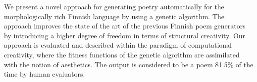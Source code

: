 We present a novel approach for generating poetry automatically for the morphologically rich Finnish language by using a genetic algorithm. The approach improves the state of the art of the previous Finnish poem generators by introducing a higher degree of freedom in terms of structural creativity. Our approach is evaluated and described within the paradigm of computational creativity, where the fitness functions of the genetic algorithm are assimilated with the notion of aesthetics. The output is considered to be a poem 81.5\% of the time by human evaluators.